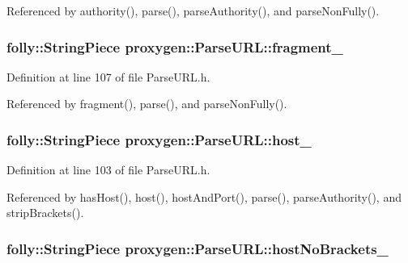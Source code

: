Referenced by authority(), parse(), parse\+Authority(), and parse\+Non\+Fully().

\subsubsection[{fragment\+\_\+}]{\setlength{\rightskip}{0pt plus 5cm}folly\+::\+String\+Piece proxygen\+::\+Parse\+U\+R\+L\+::fragment\+\_\+\hspace{0.3cm}{\ttfamily [private]}}\label{classproxygen_1_1ParseURL_a96121c158a5a7b3b46fe207352ed4db1}


Definition at line 107 of file Parse\+U\+R\+L.\+h.



Referenced by fragment(), parse(), and parse\+Non\+Fully().

\subsubsection[{host\+\_\+}]{\setlength{\rightskip}{0pt plus 5cm}folly\+::\+String\+Piece proxygen\+::\+Parse\+U\+R\+L\+::host\+\_\+\hspace{0.3cm}{\ttfamily [private]}}\label{classproxygen_1_1ParseURL_a6a6fbf4bf17d0b8750f6427913b643db}


Definition at line 103 of file Parse\+U\+R\+L.\+h.



Referenced by has\+Host(), host(), host\+And\+Port(), parse(), parse\+Authority(), and strip\+Brackets().

\subsubsection[{host\+No\+Brackets\+\_\+}]{\setlength{\rightskip}{0pt plus 5cm}folly\+::\+String\+Piece proxygen\+::\+Parse\+U\+R\+L\+::host\+No\+Brackets\+\_\+\hspace{0.3cm}{\ttfamily [private]}}\label{classproxygen_1_1ParseURL_ad26b8b96f00945590e5f7b273394df9c}


